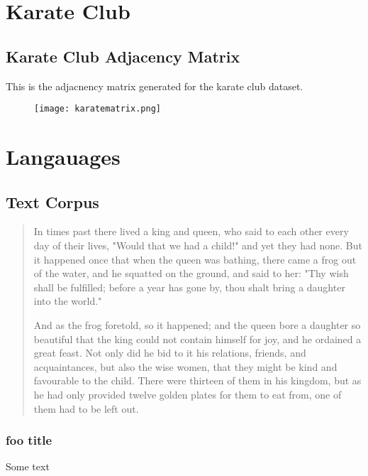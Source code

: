\begin{appendices}
\chapter{Karate Club}
\section{Karate Club Adjacency Matrix}\label{app:karateadj}
This is the adjacnency matrix generated for the karate club dataset.
\begin{figure}[H]
	\centering
	\texttt{[image: karatematrix.png]}
\end{figure}

\chapter{Langauages}
\section{Text Corpus}
\begin{quote}
In times past there lived a king and queen, who said to each other every day of their lives, "Would that we had a child!" and yet they had none. But it happened once that when the queen was bathing, there came a frog out of the water, and he squatted on the ground, and said to her: "Thy wish shall be fulfilled; before a year has gone by, thou shalt bring a daughter into the world."

And as the frog foretold, so it happened; and the queen bore a daughter so beautiful that the king could not contain himself for joy, and he ordained a great feast. Not only did he bid to it his relations, friends, and acquaintances, but also the wise women, that they might be kind and favourable to the child. There were thirteen of them in his kingdom, but as he had only provided twelve golden plates for them to eat from, one of them had to be left out.
\end{quote}
\subsection{foo title}
Some text

\end{appendices}